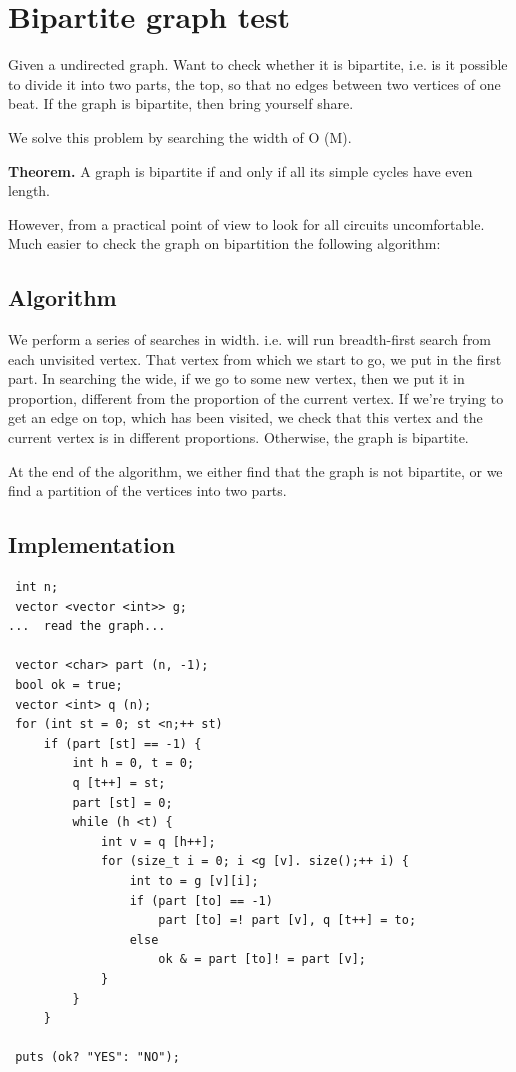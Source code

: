 \section{ Bipartite graph test }
Given a undirected graph. Want to check whether it is bipartite, i.e. is it possible to divide it into two parts, the top, so that no edges between two vertices of one beat. If the graph is bipartite, then bring yourself share.

We solve this problem by searching the width of O (M).

\textbf{Theorem.} A graph is bipartite if and only if all its simple cycles have even length.

However, from a practical point of view to look for all circuits uncomfortable. Much easier to check the graph on bipartition the following algorithm:

\subsection{ Algorithm }
We perform a series of searches in width. i.e. will run breadth-first search from each unvisited vertex. That vertex from which we start to go, we put in the first part. In searching the wide, if we go to some new vertex, then we put it in proportion, different from the proportion of the current vertex. If we're trying to get an edge on top, which has been visited, we check that this vertex and the current vertex is in different proportions. Otherwise, the graph is bipartite.

At the end of the algorithm, we either find that the graph is not bipartite, or we find a partition of the vertices into two parts.

\subsection{ Implementation }
\begin{verbatim}
 int n;
 vector <vector <int>> g;
...  read the graph...

 vector <char> part (n, -1);
 bool ok = true;
 vector <int> q (n);
 for (int st = 0; st <n;++ st)
     if (part [st] == ​​-1) {
         int h = 0, t = 0;
         q [t++] = st;
         part [st] = 0;
         while (h <t) {
             int v = q [h++];
             for (size_t i = 0; i <g [v]. size();++ i) {
                 int to = g [v][i];
                 if (part [to] == -1)
                     part [to] =! part [v], q [t++] = to;
                 else
                     ok & = part [to]! = part [v];
             }
         }
     }

 puts (ok? "YES": "NO"); 
\end{verbatim}

